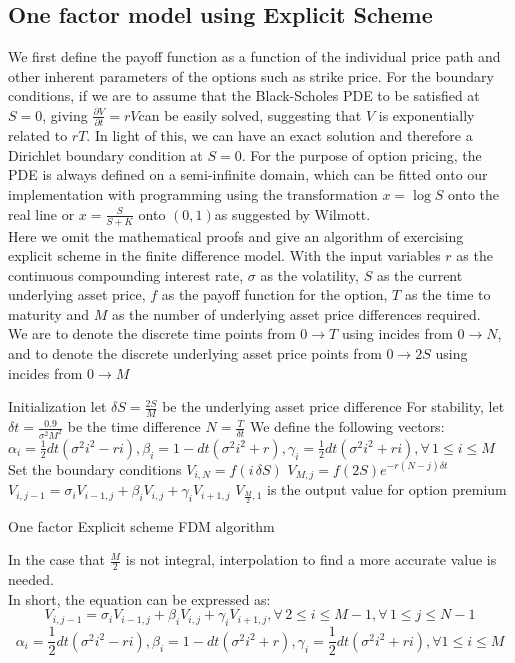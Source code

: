 \subsection{One factor model using Explicit Scheme}
We first define the payoff function as a function of the individual price path and other inherent parameters of the options such as strike price. For the boundary conditions, if we are to assume that the Black-Scholes PDE to be satisfied at $S = 0$, giving $\frac{\partial V}{\partial t} = rV$can be easily solved, suggesting that $V$ is exponentially related to $rT$. In light of this, we can have an exact solution and therefore a Dirichlet boundary condition at $S = 0$. For the purpose of option pricing, the PDE is always defined on a semi-infinite domain, which can be fitted onto our implementation with programming using the transformation $x = \log{S}$ onto the real line or $x = \frac{S}{S+K}$ onto $(0, 1)$as suggested by Wilmott.\\
Here we omit the mathematical proofs and give an algorithm of exercising explicit scheme in the finite difference model. With the input variables $r$ as the continuous compounding interest rate, $\sigma$ as the volatility, $S$ as the current underlying asset price, $f$ as the payoff function for the option, $T$ as the time to maturity and $M$ as the number of underlying asset price differences required.\\
We are to denote the discrete time points from $0 \to T$ using incides from $0 \to N$, and to denote the discrete underlying asset price points from $0 \to 2S$ using incides from $0 \to M$
\begin{algorithm}[H]
 Initialization\;
 let $\delta S = \frac{2S}{M}$ be the underlying asset price difference \;
 For stability, let $\delta t = \frac{0.9}{\sigma^{2}M^{2}}$ be the time difference\;
 $N = \frac{T}{\delta t}$\;
 We define the following vectors:\\
 $\alpha_{i} = \frac{1}{2}dt(\sigma^{2}i^{2} - ri), \beta_{i} = 1-dt(\sigma^{2}i^{2} + r), \gamma_{i} = \frac{1}{2}dt(\sigma^{2}i^{2} + ri), \forall \, 1 \le i \le M$\;
 Set the boundary conditions\;
  {
  $V_{i, N} = f(i\,\delta S)$\;
 }
  {
  $V_{M, j} = f(2S)e^{-r(N-j)\delta t}$\;
 }
  {
   {
   $V_{i, j-1} = \sigma_{i}V_{i-1,j} + \beta_{i}V_{i,j} + \gamma_{i}V_{i+1,j} $\;
  }
 }
 $V_{\frac{M}{2},1}$ is the output value for option premium\;
\caption{One factor Explicit scheme FDM algorithm}
\end{algorithm}
In the case that $\frac{M}{2}$ is not integral, interpolation to find a more accurate value is needed.\\[1mm]
In short, the equation can be expressed as:
$$V_{i, j-1} = \sigma_{i}V_{i-1,j} + \beta_{i}V_{i,j} + \gamma_{i}V_{i+1,j},  \forall \,2 \le i \le M-1, \forall \,1 \le j \le N-1$$
$$\alpha_{i} = \frac{1}{2}dt(\sigma^{2}i^{2} - ri), \beta_{i} = 1-dt(\sigma^{2}i^{2} + r), \gamma_{i} = \frac{1}{2}dt(\sigma^{2}i^{2} + ri), \forall 1 \le i \le M$$
\newpage
